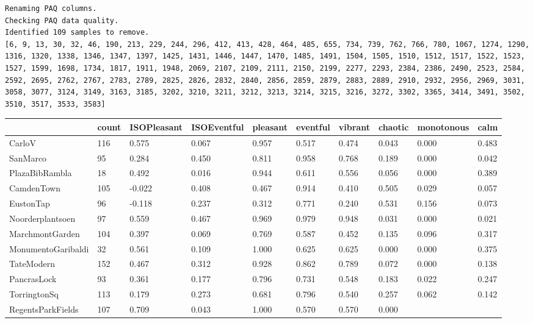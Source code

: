 \documentclass[
  authoryear,
  preprint,
  3p]{elsarticle}
\begin{document}
\begin{verbatim}
Renaming PAQ columns.
Checking PAQ data quality.
Identified 109 samples to remove.
[6, 9, 13, 30, 32, 46, 190, 213, 229, 244, 296, 412, 413, 428, 464, 485, 655, 734, 739, 762, 766, 780, 1067, 1274, 1290, 1316, 1320, 1338, 1346, 1347, 1397, 1425, 1431, 1446, 1447, 1470, 1485, 1491, 1504, 1505, 1510, 1512, 1517, 1522, 1523, 1527, 1599, 1698, 1734, 1817, 1911, 1948, 2069, 2107, 2109, 2111, 2150, 2199, 2277, 2293, 2384, 2386, 2490, 2523, 2584, 2592, 2695, 2762, 2767, 2783, 2789, 2825, 2826, 2832, 2840, 2856, 2859, 2879, 2883, 2889, 2910, 2932, 2956, 2969, 3031, 3058, 3077, 3124, 3149, 3163, 3185, 3202, 3210, 3211, 3212, 3213, 3214, 3215, 3216, 3272, 3302, 3365, 3414, 3491, 3502, 3510, 3517, 3533, 3583]
\end{verbatim}

\begin{longtable}[]{@{}llllllllll@{}}
\toprule\noalign{}
& count & ISOPleasant & ISOEventful & pleasant & eventful & vibrant &
chaotic & monotonous & calm \\
\midrule\noalign{}
\endhead
\bottomrule\noalign{}
\endlastfoot
CarloV & 116 & 0.575 & 0.067 & 0.957 & 0.517 & 0.474 & 0.043 & 0.000 &
0.483 \\
SanMarco & 95 & 0.284 & 0.450 & 0.811 & 0.958 & 0.768 & 0.189 & 0.000 &
0.042 \\
PlazaBibRambla & 18 & 0.492 & 0.016 & 0.944 & 0.611 & 0.556 & 0.056 &
0.000 & 0.389 \\
CamdenTown & 105 & -0.022 & 0.408 & 0.467 & 0.914 & 0.410 & 0.505 &
0.029 & 0.057 \\
EustonTap & 96 & -0.118 & 0.237 & 0.312 & 0.771 & 0.240 & 0.531 & 0.156
& 0.073 \\
Noorderplantsoen & 97 & 0.559 & 0.467 & 0.969 & 0.979 & 0.948 & 0.031 &
0.000 & 0.021 \\
MarchmontGarden & 104 & 0.397 & 0.069 & 0.769 & 0.587 & 0.452 & 0.135 &
0.096 & 0.317 \\
MonumentoGaribaldi & 32 & 0.561 & 0.109 & 1.000 & 0.625 & 0.625 & 0.000
& 0.000 & 0.375 \\
TateModern & 152 & 0.467 & 0.312 & 0.928 & 0.862 & 0.789 & 0.072 & 0.000
& 0.138 \\
PancrasLock & 93 & 0.361 & 0.177 & 0.796 & 0.731 & 0.548 & 0.183 & 0.022
& 0.247 \\
TorringtonSq & 113 & 0.179 & 0.273 & 0.681 & 0.796 & 0.540 & 0.257 &
0.062 & 0.142 \\
RegentsParkFields & 107 & 0.709 & 0.043 & 1.000 & 0.570 & 0.570 & 0.000

\end{longtable}
\end{document}
